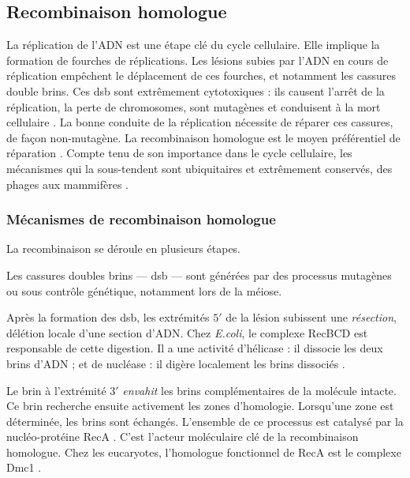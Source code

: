 \documentclass[11pt, oneside]{scrartcl}
\begin{document}

\subsection{Recombinaison homologue}
\label{sec:orgheadline6}

La réplication de l'ADN est une étape clé du cycle cellulaire. Elle implique la
formation de fourches de réplications. Les lésions subies par l'ADN en cours de
réplication empêchent le déplacement de ces fourches, et notamment les cassures
double brins. Ces \ac{dsb} sont extrêmement cytotoxiques : ils causent l'arrêt
de la réplication, la perte de chromosomes, sont mutagènes et conduisent à la
mort cellulaire \cite{watson_molecular_2014}. La bonne conduite de la
réplication nécessite de réparer ces cassures, de façon non-mutagène. La
recombinaison homologue est le moyen préférentiel de réparation
\cite{lusetti_bacterial_2002}. Compte tenu de son importance dans le cycle
cellulaire, les mécanismes qui la sous-tendent sont ubiquitaires et extrêmement
conservés, des phages aux mammifères \cite{cromie_recombination_2001}.

\subsubsection{Mécanismes de recombinaison homologue}
\label{sec:orgheadline3}

La recombinaison se déroule en plusieurs étapes. 

Les cassures doubles brins --- \ac{dsb} --- sont générées par des processus
mutagènes ou sous contrôle génétique, notamment lors de la méiose. 

Après la formation des \ac{dsb}, les extrémités \(5'\) de la lésion subissent une
\emph{résection}, délétion locale d'une section d'ADN. Chez \emph{E.coli}, le complexe
RecBCD est responsable de cette digestion. Il a une activité d'hélicase : il
dissocie les deux brins d'ADN ; et de nucléase : il digère localement les brins
dissociés \cite{dillingham_recbcd_2008}.

Le brin à l'extrémité \(3'\) \emph{envahit} les brins complémentaires de la molécule
intacte. Ce brin recherche ensuite activement les zones d'homologie. Lorsqu'une
zone est déterminée, les brins sont échangés. L'ensemble de ce processus est
catalysé par la nucléo-protéine RecA \cite{chen_mechanism_2008}. C'est l'acteur
moléculaire clé de la recombinaison homologue. Chez les eucaryotes, l'homologue
fonctionnel de RecA est le complexe Dmc1 \cite{bishop_dmc1:_1992}.
\end{document}
